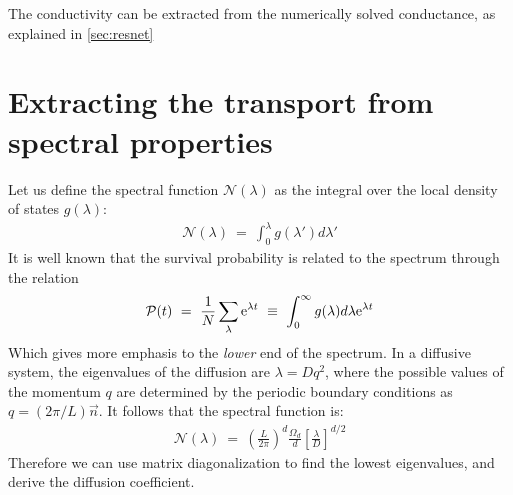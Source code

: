 The conductivity can be extracted from the 
numerically solved conductance, as explained in \autoref{sec:resnet}

\section{Extracting the transport from spectral properties}\label{sec:spectrum}

Let us define the spectral function $\mathcal{N}(\lambda)$ as
the integral over the local density of states $g(\lambda)$:
%
\begin{align}
\mathcal{N}(\lambda)\ =\ \int_0^\lambda g(\lambda')d\lambda'
\end{align}
%
It is well known that the survival probability is related to the spectrum through the relation
%
\begin{align}
\mathcal{P}(t)\ =\ \frac{1}{N}\sum_\lambda \eexp{\lambda t} \ \equiv \ \int_0^\infty g(\lambda)d\lambda  \eexp{\lambda t}
\end{align}
%
Which gives more emphasis to the \emph{lower} end of the spectrum.
In a diffusive system, the eigenvalues of the diffusion are $\lambda=Dq^2$, where the possible values of the momentum $q$ are determined by the periodic boundary conditions as $q=(2\pi/L)\vec{n}$. It follows that the spectral function is:
\begin{align}
\mathcal{N}(\lambda)\ =\ \left(\frac{L}{2\pi}\right)^d \frac{\Omega_d}{d} \left[\frac{\lambda}{D}\right]^{d/2}
\end{align}
%
Therefore we can use matrix diagonalization to find the lowest
eigenvalues, and derive the diffusion coefficient.










